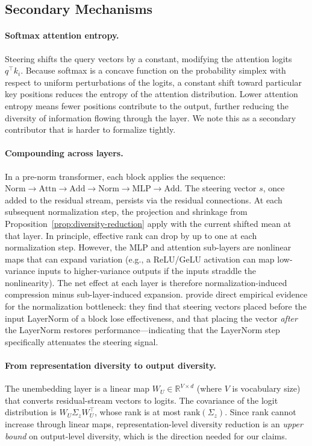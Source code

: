 \subsection{Secondary Mechanisms}

\paragraph{Softmax attention entropy.}
Steering shifts the query vectors by a constant, modifying the attention logits $q^\top k_i$.
Because softmax is a concave function on the probability simplex with respect to uniform perturbations of the logits, a constant shift toward particular key positions reduces the entropy of the attention distribution.
Lower attention entropy means fewer positions contribute to the output, further reducing the diversity of information flowing through the layer.
We note this as a secondary contributor that is harder to formalize tightly.

\paragraph{Compounding across layers.}
In a pre-norm transformer, each block applies the sequence:
$\mathrm{Norm} \to \mathrm{Attn} \to \mathrm{Add} \to \mathrm{Norm} \to \mathrm{MLP} \to \mathrm{Add}$.
The steering vector $s$, once added to the residual stream, persists via the residual connections.
At each subsequent normalization step, the projection and shrinkage from Proposition~\ref{prop:diversity-reduction} apply with the current shifted mean at that layer.
In principle, effective rank can drop by up to one at each normalization step.
However, the MLP and attention sub-layers are nonlinear maps that can expand variation (e.g., a ReLU/GeLU activation can map low-variance inputs to higher-variance outputs if the inputs straddle the nonlinearity).
The net effect at each layer is therefore normalization-induced compression minus sub-layer-induced expansion.
\citet{sinii2025small} provide direct empirical evidence for the normalization bottleneck: they find that steering vectors placed before the input LayerNorm of a block lose effectiveness, and that placing the vector \emph{after} the LayerNorm restores performance---indicating that the LayerNorm step specifically attenuates the steering signal.

\paragraph{From representation diversity to output diversity.}
The unembedding layer is a linear map $W_U \in \mathbb{R}^{V \times d}$ (where $V$ is vocabulary size) that converts residual-stream vectors to logits.
The covariance of the logit distribution is $W_U \Sigma_z W_U^\top$, whose rank is at most $\mathrm{rank}(\Sigma_z)$.
Since rank cannot increase through linear maps, representation-level diversity reduction is an \emph{upper bound} on output-level diversity, which is the direction needed for our claims.

